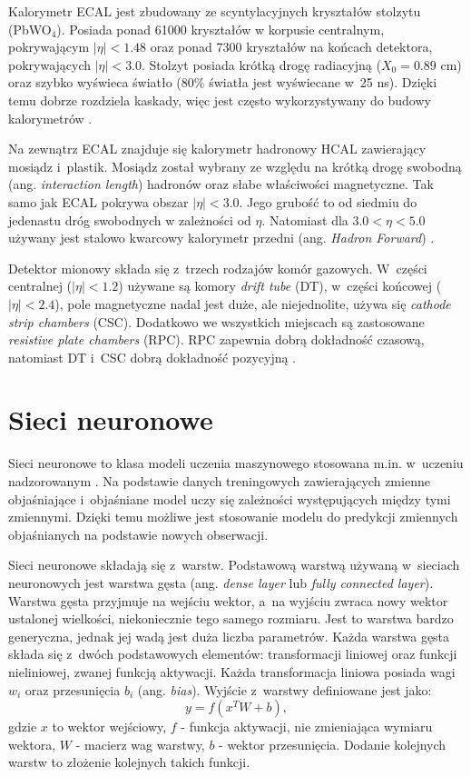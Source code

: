 \documentclass{pracalicmgr}
\begin{document}
	Kalorymetr ECAL jest zbudowany ze scyntylacyjnych kryształów stolzytu (PbWO$_4$). Posiada ponad 61000 kryształów w korpusie centralnym, pokrywającym $|\eta| < 1.48$ oraz ponad 7300 kryształów na końcach detektora, pokrywających $|\eta| < 3.0$. Stolzyt posiada krótką drogę radiacyjną ($X_0 = 0.89$ cm) oraz szybko wyświeca światło (80\% światła jest wyświecane w~25 ns). Dzięki temu dobrze rozdziela kaskady, więc jest często wykorzystywany do budowy kalorymetrów \cite{cms_technical}.
	
	Na zewnątrz ECAL znajduje się kalorymetr hadronowy HCAL zawierający mosiądz i~plastik. Mosiądz został wybrany ze względu na krótką drogę swobodną (ang. \textit{interaction length}) hadronów oraz słabe właściwości magnetyczne.
Tak samo jak ECAL pokrywa obszar $|\eta| < 3.0$. Jego grubość to od siedmiu do jedenastu dróg swobodnych w zależności od $\eta$. Natomiast dla $3.0 < \eta < 5.0$ używany jest stalowo kwarcowy kalorymetr przedni (ang. \textit{Hadron Forward}) \cite{cms_technical}.
	
	Detektor mionowy składa się z~trzech rodzajów komór gazowych. W~części centralnej ($|\eta| < 1.2$) używane są komory \textit{drift tube} (DT), w~części końcowej ($|\eta| < 2.4$), pole magnetyczne nadal jest duże, ale niejednolite, używa się \textit{cathode strip chambers} (CSC). Dodatkowo we wszystkich miejscach są zastosowane \textit{resistive plate chambers} (RPC). RPC zapewnia dobrą dokładność czasową, natomiast DT i~CSC dobrą dokładność pozycyjną \cite{cms_technical}.	
	
	\section{Sieci neuronowe}
	Sieci neuronowe to klasa modeli uczenia maszynowego stosowana m.in. w~uczeniu nadzorowanym \cite{dl}. Na podstawie danych treningowych zawierających zmienne objaśniające i~objaśniane model uczy się zależności występujących między tymi zmiennymi. Dzięki temu możliwe jest stosowanie modelu do predykcji zmiennych objaśnianych na podstawie nowych obserwacji.
	
	Sieci neuronowe składają się z~warstw. Podstawową warstwą używaną w~sieciach neuronowych jest warstwa gęsta (ang. \textit{dense layer} lub \textit{fully connected layer}). Warstwa gęsta przyjmuje na wejściu wektor, a~na wyjściu zwraca nowy wektor ustalonej wielkości, niekoniecznie tego samego rozmiaru. Jest to warstwa bardzo generyczna, jednak jej wadą jest duża liczba parametrów. Każda warstwa gęsta składa się z~dwóch podstawowych elementów: transformacji liniowej oraz funkcji nieliniowej, zwanej funkcją aktywacji. Każda transformacja liniowa posiada wagi $w_i$ oraz przesunięcia $b_i$ (ang. \textit{bias}). Wyjście z~warstwy definiowane jest jako: $$y = f(x^TW + b),$$ gdzie $x$ to wektor wejściowy, $f$ - funkcja aktywacji, nie zmieniająca wymiaru wektora, $W$ - macierz wag warstwy, $b$ - wektor przesunięcia. Dodanie kolejnych warstw to złożenie kolejnych takich funkcji.
	
\end{document}

